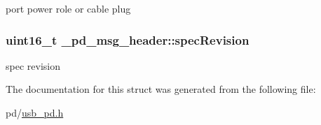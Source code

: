 port power role or cable plug \hypertarget{struct__pd__msg__header_a037df5a4b49f0a0e035aaa28201ae20e}{
\subsubsection[{spec\-Revision}]{\setlength{\rightskip}{0pt plus 5cm}uint16\-\_\-t \-\_\-pd\-\_\-msg\-\_\-header\-::spec\-Revision}}\label{struct__pd__msg__header_a037df5a4b49f0a0e035aaa28201ae20e}
spec revision 

The documentation for this struct was generated from the following file\-:\begin{DoxyCompactItemize}
\item 
pd/\hyperlink{usb__pd_8h}{usb\-\_\-pd.\-h}\end{DoxyCompactItemize}
